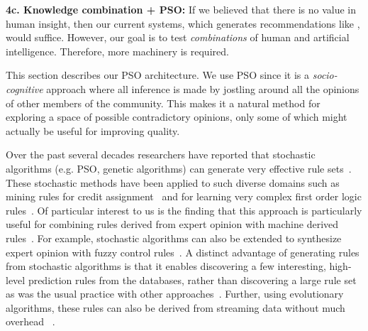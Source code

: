 {\bf 4c. Knowledge combination + PSO:} If we believed that there is no value in human insight, then our current
systems, which generates recommendations like , would suffice.  However, our goal is to
test {\em combinations}
of human and artificial intelligence. Therefore, more machinery is required.

This  section describes our PSO architecture.  
We use PSO since it is a  {\em socio-cognitive} approach where
 all inference is made by jostling around
all the  opinions of other members of the community.
This makes it a natural method for exploring a space of possible contradictory opinions, only some of which might   actually be useful
for improving quality.







 
 
 Over the past several decades researchers have reported that stochastic algorithms (e.g. PSO, genetic algorithms) can 
 generate very effective rule sets~\cite{Gold85, dejong90, dejon93, vent93,va92}. These stochastic methods have been applied to such diverse domains such as mining rules for credit assignment~\cite{grefen, grefenstette93} and for learning very complex first order logic rules~\cite{Aug95}. Of particular interest to us is the finding that this approach is particularly useful for combining rules derived from expert opinion with machine derived rules~\cite{Ish97}. For
 example, stochastic algorithms can also be extended to synthesize expert opinion with fuzzy control rules~\cite{he98}.
A distinct advantage of generating rules from stochastic algorithms is that it enables discovering a few interesting, high-level prediction rules from the databases, rather than discovering  a large rule set as was the usual practice with other approaches~\cite{Fr98}. Further, using evolutionary algorithms, these rules can also be derived from streaming data without much overhead ~\cite{Vi11}.


